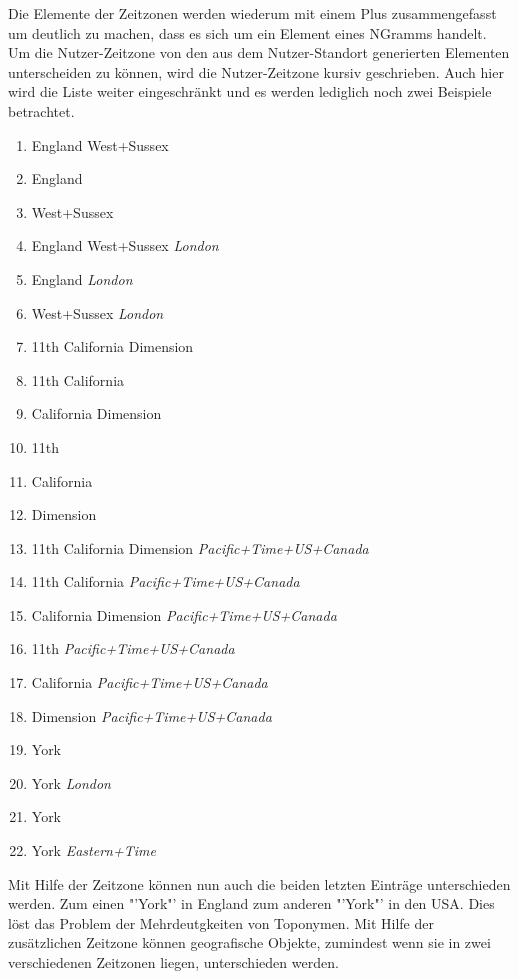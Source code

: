 				Die Elemente der Zeitzonen werden wiederum mit einem Plus zusammengefasst um deutlich zu machen, dass es sich um ein Element eines NGramms handelt.
				Um die Nutzer-Zeitzone von den aus dem Nutzer-Standort generierten Elementen unterscheiden zu können, wird die Nutzer-Zeitzone kursiv geschrieben.
				Auch hier wird die Liste weiter eingeschränkt und es werden lediglich noch zwei Beispiele betrachtet.
				\begin{multicols}{2}
					\begin{enumerate}
						\item England West+Sussex
						\item  England  
						\item  West+Sussex  
						\item  England    West+Sussex   \textit{London}
						\item  England   \textit{London}
						\item  West+Sussex   \textit{London}
						\item  11th    California    Dimension    
						\item  11th    California  
						\item  California    Dimension   
						\item  11th  
						\item  California  
						\item  Dimension   
						\item  11th  California    Dimension   \textit{Pacific+Time+US+Canada}
						\item  11th    California   \textit{Pacific+Time+US+Canada}
						\item  California    Dimension   \textit{Pacific+Time+US+Canada}
						\item  11th   \textit{Pacific+Time+US+Canada}
						\item  California   \textit{Pacific+Time+US+Canada}
						\item  Dimension   \textit{Pacific+Time+US+Canada}
						\item York
						\item  York   \textit{London}
						\item York
						\item  York   \textit{Eastern+Time}
					\end{enumerate}	
				\end{multicols}
				Mit Hilfe der Zeitzone können nun auch die beiden letzten Einträge unterschieden werden. 
				Zum einen "'York"' in England zum anderen "'York"' in den USA. 
				Dies löst das Problem der Mehrdeutgkeiten von Toponymen. 
				Mit Hilfe der zusätzlichen Zeitzone können geografische Objekte, zumindest wenn sie in zwei verschiedenen Zeitzonen liegen, unterschieden werden.

